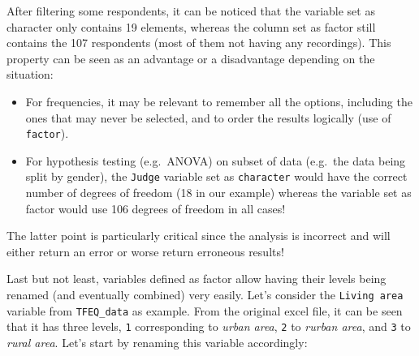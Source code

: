 \documentclass[
]{book}
\newenvironment{Shaded}{\begin{snugshade}}{\end{snugshade}}
\newcommand{\AttributeTok}[1]{\textcolor[rgb]{0.77,0.63,0.00}{#1}}
\newcommand{\DecValTok}[1]{\textcolor[rgb]{0.00,0.00,0.81}{#1}}
\newcommand{\FunctionTok}[1]{\textcolor[rgb]{0.00,0.00,0.00}{#1}}
\newcommand{\NormalTok}[1]{#1}
\newcommand{\OtherTok}[1]{\textcolor[rgb]{0.56,0.35,0.01}{#1}}
\newcommand{\SpecialCharTok}[1]{\textcolor[rgb]{0.00,0.00,0.00}{#1}}
\newcommand{\StringTok}[1]{\textcolor[rgb]{0.31,0.60,0.02}{#1}}
\providecommand{\tightlist}{%
  \setlength{\itemsep}{0pt}\setlength{\parskip}{0pt}}
\begin{document}
After filtering some respondents, it can be noticed that the variable set as character only contains 19 elements, whereas the column set as factor still contains the 107 respondents (most of them not having any recordings). This property can be seen as an advantage or a disadvantage depending on the situation:

\begin{itemize}
\tightlist
\item
  For frequencies, it may be relevant to remember all the options, including the ones that may never be selected, and to order the results logically (use of \texttt{factor}).
\item
  For hypothesis testing (e.g.~ANOVA) on subset of data (e.g.~the data being split by gender), the \texttt{Judge} variable set as \texttt{character} would have the correct number of degrees of freedom (18 in our example) whereas the variable set as factor would use 106 degrees of freedom in all cases!
\end{itemize}

The latter point is particularly critical since the analysis is incorrect and will either return an error or worse return erroneous results!

Last but not least, variables defined as factor allow having their levels being renamed (and eventually combined) very easily.
Let's consider the \texttt{Living\ area} variable from \texttt{TFEQ\_data} as example. From the original excel file, it can be seen that it has three levels, \texttt{1} corresponding to \emph{urban area}, \texttt{2} to \emph{rurban area}, and \texttt{3} to \emph{rural area}.
Let's start by renaming this variable accordingly:

\begin{Shaded}
\end{Shaded}
\end{document}
